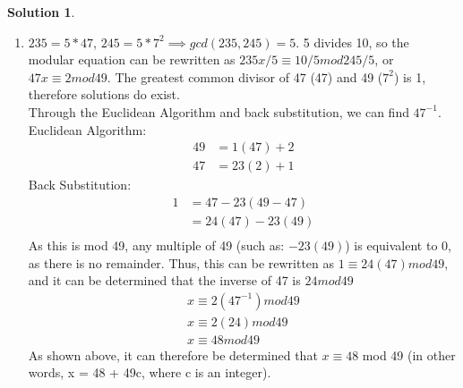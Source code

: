 \documentclass{article}
\theoremstyle{definition}
\newtheorem*{solution}{Solution}
\begin{document}
\begin{solution}
\begin{enumerate}[label = \alph*)]
    \item
    $235 = 5 * 47$, $245 = 5* 7^2 \implies gcd(235,245) = 5$. 5 divides 10, so the modular equation can be rewritten as $235x/5 \equiv 10/5 mod 245/5$, or $47x\equiv 2 mod 49$. The greatest common divisor of 47 (47) and 49 ($7^2$) is 1, therefore solutions do exist.\\
    Through the Euclidean Algorithm and back substitution, we can find $47^{-1}$.\\
    Euclidean Algorithm:
    \begin{align*}
        49&=1(47)+2\\
        47&=23(2)+1
    \end{align*}
    Back Substitution:
    \begin{align*}
        1&=47-23(49-47)\\
        &=24(47)-23(49)\\
    \end{align*}
    As this is mod 49, any multiple of 49 (such as: $-23(49)$) is equivalent to 0, as there is no remainder. Thus, this can be rewritten as $1\equiv 24(47) mod 49$, and it can be determined that the inverse of 47 is $24 mod 49$
    \begin{align*}
        x\equiv 2(47^{-1}) mod 49\\
        x\equiv 2(24) mod 49\\
        x\equiv 48 mod 49
    \end{align*}
    As shown above, it can therefore be determined that $x\equiv 48$ mod 49 (in other words, x = 48 + 49c, where c is an integer).
\end{enumerate}
\end{solution}
\end{document}
